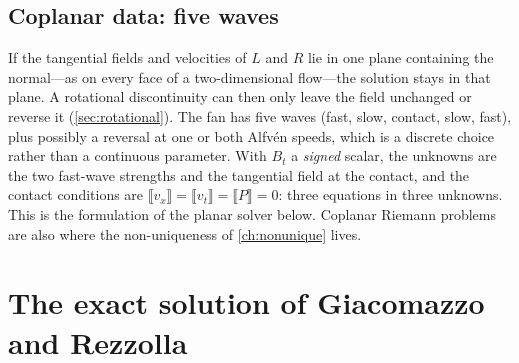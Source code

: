 \documentclass[11pt,a4paper,oneside,openany]{book}
\theoremstyle{definition}
\theoremstyle{plain}
\theoremstyle{remark}
\newcommand{\jump}[1]{\llbracket #1\rrbracket}
\newcommand{\Ptot}{P}
\begin{document}
\subsection{Coplanar data: five waves}\label{sec:coplanar}

If the tangential fields and velocities of $L$ and $R$ lie in one plane containing the
normal---as on every face of a two-dimensional flow---the solution stays in that plane.
A rotational discontinuity can then only leave the field unchanged or reverse it
(\cref{sec:rotational}). The fan has five waves (fast, slow, contact, slow, fast), plus
possibly a reversal at one or both Alfvén speeds, which is a discrete choice rather than a
continuous parameter. With $B_t$ a \emph{signed} scalar, the unknowns are the two fast-wave
strengths and the tangential field at the contact, and the contact conditions are
$\jump{v_x}=\jump{v_t}=\jump{\Ptot}=0$: three equations in three unknowns. This is the
formulation of the planar solver below. Coplanar Riemann problems are also where the
non-uniqueness of \cref{ch:nonunique} lives.

\section{The exact solution of Giacomazzo and Rezzolla}\label{sec:gr06}
\end{document}
